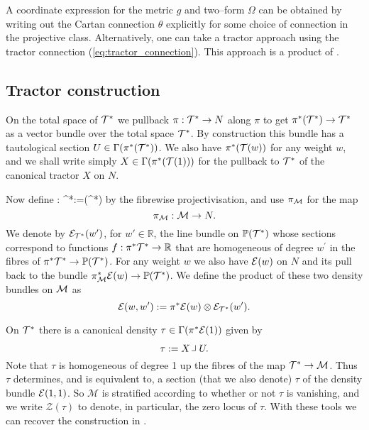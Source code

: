 A coordinate expression for the metric $g$ and two--form $\Omega$ can be obtained by writing out the Cartan connection $\theta$ explicitly for some choice of connection in the projective class. Alternatively, one can take a tractor approach using the tractor connection (\ref{eq:tractor_connection}). This approach is a product of \cite{DGW}.

\subsection{Tractor construction}
On the total space of $\mathcal{T}^*$ we pullback $\pi:\mathcal{T}^*\to N$ along $\pi$ to get $\pi^*(\mathcal{T}^*)\to \mathcal{T}^*$ as a vector bundle over the total space $\mathcal{T}^*$. By construction this bundle has a tautological section $U\in \Gamma (\pi^*(\mathcal{T}^*))$.  We also have $\pi^*(\mathcal{T}(w))$ for any weight $w$, and we shall write simply $X\in \Gamma(\pi^*(\mathcal{T}(1)))$ for the pullback to $\mathcal{T}^*$ of the canonical tractor $X$ on $N$.

Now define
\be
\label{projection_map}
\kappa: \cT^*\longrightarrow {}:=(\cT^*)
\ee
by the fibrewise projectivisation, and use $\pi_{\mathcal{M}}$ for the map
$$
\pi_{\mathcal{M}}:\mathcal{M}\to N.
$$
We denote by $\mathcal{E}_{\mathcal{T}^*}(w')$, for $w'\in \mathbb{R}$, the line
bundle on $\mathbb{P}(\mathcal{T}^*)$ whose sections correspond to functions
$f: \pi^*\mathcal{T}^* \to\mathbb{R} $ that are homogeneous of degree $w^\prime$ in
the fibres of $\pi^*\mathcal{T}^*\to \mathbb{P}(\mathcal{T}^*)$. For any weight $w$ we also have $\mathcal{E}(w)$ on $N$ and its pull back to the bundle $\pi_{\mathcal{M}}^*\mathcal{E}(w)\to \mathbb{P}(\mathcal{T}^*)$.
We define the product of these two density bundles on $\mathcal{M}$ as
$$
\mathcal{E}(w,w'):= \pi^*\mathcal{E}(w) \otimes \mathcal{E}_{\mathcal{T}^*}(w').
$$

On $\mathcal{T}^*$ there is  a canonical density $\tau\in \Gamma(\pi^*\mathcal{E}(1))$ given by
$$
\tau:= X\hook U .
$$
Note that $\tau$ is homogeneous of degree 1 up the fibres of the
map $\mathcal{T}^*\to \mathcal{M}$. Thus $\tau$ determines, and is equivalent
to, a section (that we also denote) $\tau$ of the density bundle $\mathcal{E}(1,1)$. So $\mathcal{M}$ is stratified according to
whether or not $\tau$ is vanishing, and we write $\mathcal{Z}(\tau)$
to denote, in particular, the zero locus of $\tau$. With these tools we can recover the construction in \cite{DM}.


